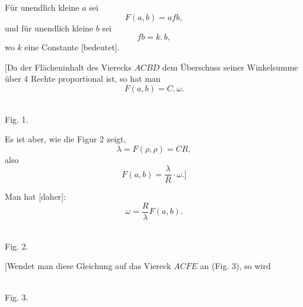%
Für unendlich kleine $a$ sei
\[
F(a, b) = afb,
\]
und für unendlich kleine $b$ sei
\[
fb = k.\,b,
\]
wo $k$ eine Constante [bedeutet].

[Da der Flächeninhalt des Vierecks $ACBD$ dem Überschuss seiner Winkelsumme über 4 Rechte proportional ist, so hat man
\[
F(a, b) = C.\,\omega.
\]

\begin{center}\begin{minipage}{\linewidth}\centering\\[3pt]Fig. 1.\end{minipage}\end{center}

Es ist aber, wie die Figur 2 zeigt,
\[
\lambda = F(\rho, \rho) = CR,
\]
also
\[
F(a,b) = \frac{\lambda}{R}\cdot\omega.]
\]

Man hat [daher]:
\[
\tag*{1)} \omega = \frac{R}{\lambda} F(a,b).
\]

\begin{center}\begin{minipage}{\linewidth}\centering\\[3pt]Fig. 2.\end{minipage}\end{center}

[Wendet man diese Gleichung auf das Viereck $ACFE$ an (Fig. 3), so wird

\begin{center}\begin{minipage}{\linewidth}\centering\\[3pt]Fig. 3.\end{minipage}\end{center}
